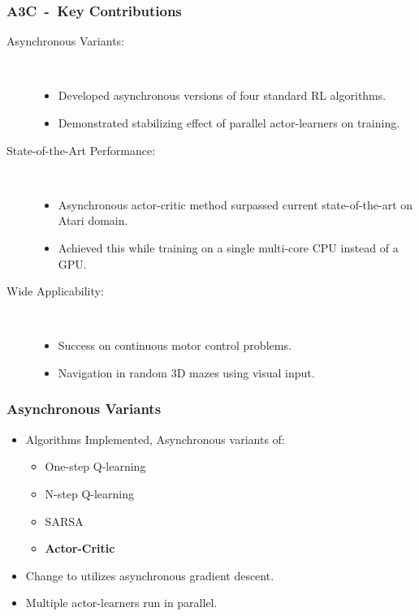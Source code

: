 \documentclass{beamer}
\begin{document}
    \begin{frame}
        \frametitle{A3C~-~Key Contributions}
        \begin{description}
            \item[Asynchronous Variants:] \phantom{}\\
                \begin{itemize}
                    \item Developed asynchronous versions of four standard RL algorithms.
                    \item Demonstrated stabilizing effect of parallel actor-learners on training.
                \end{itemize}
            \item[State-of-the-Art Performance:] \phantom{}\\
                \begin{itemize}
                    \item Asynchronous actor-critic method surpassed current 
                    state-of-the-art on Atari domain.
                    \item Achieved this while training on a single multi-core CPU 
                    instead of a GPU.%
                \end{itemize}
            \item[Wide Applicability:] \phantom{}\\
                \begin{itemize}
                    \item Success on continuous motor control problems.
                    \item Navigation in random 3D mazes using visual input.
                \end{itemize}
        \end{description}
    \end{frame}

    \begin{frame}
        \frametitle{Asynchronous Variants}
        \begin{itemize}
            \item Algorithms Implemented,
            Asynchronous variants of:
            \begin{itemize}
                \item One-step Q-learning
                \item N-step Q-learning
                \item SARSA
                \item \textbf{Actor-Critic}
            \end{itemize} 
            \item Change to utilizes asynchronous gradient descent.
            \item Multiple actor-learners run in parallel.
        \end{itemize}
    \end{frame}
\end{document}
